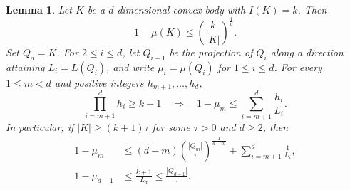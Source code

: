 \documentclass[reqno, 11pt]{article}
\numberwithin{equation}{section}
\newtheorem{lemma}[lemma]{Lemma}
\theoremstyle{definition}
\begin{document}
\begin{lemma}\label{aux:flag}
Let $K$ be a $d$-dimensional convex body with $I(K)=k$. Then
\begin{equation}\label{eq:gzpw-density}
                      1-\mu(K)\le(\frac{k}{|K|})^{\frac{1}{d}}.
\end{equation}
Set $Q_d=K$. For $2\le i\le d$, let $Q_{i-1}$ be the projection
of $Q_i$ along a direction attaining $L_i=L(Q_i)$, and write
$\mu_i=\mu(Q_i)$ for $1\le i\le d$.
For every $1\le m<d$ and positive integers $h_{m+1},\ldots,h_d$,
\begin{equation}\label{eq:gzpw-integer-count}
     \prod_{i=m+1}^d h_i\ge k+1
        \quad\Longrightarrow\quad
        1-\mu_m\le\sum_{i=m+1}^d \frac{h_i}{L_i} .
\end{equation}
In particular, if $|K|\ge(k+1)\tau$ for some $\tau>0$ and $d\ge2$, then
\begin{align}
  1-\mu_m &\le (d-m)(\frac{|Q_m|}{\tau})^{\frac{1}{d-m}}
                      +\sum_{i=m+1}^d \frac{1}{L_i} ,
                         \label{eq:gzpw-continuous-count}\\
  1-\mu_{d-1}&\le \frac{k+1}{L_d}\le \frac{|Q_{d-1}|}{\tau} .
                         \label{eq:gzpw-one-step}
\end{align}
\end{lemma}
\end{document}
